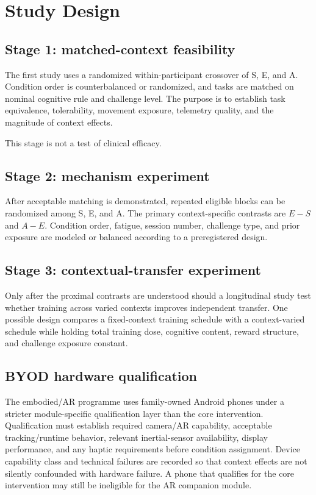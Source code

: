 \section{Study Design}

\subsection{Stage 1: matched-context feasibility}

The first study uses a randomized within-participant crossover of S, E, and A. Condition order is counterbalanced or randomized, and tasks are matched on nominal cognitive rule and challenge level. The purpose is to establish task equivalence, tolerability, movement exposure, telemetry quality, and the magnitude of context effects.

This stage is not a test of clinical efficacy.

\subsection{Stage 2: mechanism experiment}

After acceptable matching is demonstrated, repeated eligible blocks can be randomized among S, E, and A. The primary context-specific contrasts are \(E-S\) and \(A-E\). Condition order, fatigue, session number, challenge type, and prior exposure are modeled or balanced according to a preregistered design.

\subsection{Stage 3: contextual-transfer experiment}

Only after the proximal contrasts are understood should a longitudinal study test whether training across varied contexts improves independent transfer. One possible design compares a fixed-context training schedule with a context-varied schedule while holding total training dose, cognitive content, reward structure, and challenge exposure constant.

\subsection{BYOD hardware qualification}

The embodied/AR programme uses family-owned Android phones under a stricter module-specific qualification layer than the core intervention. Qualification must establish required camera/AR capability, acceptable tracking/runtime behavior, relevant inertial-sensor availability, display performance, and any haptic requirements before condition assignment. Device capability class and technical failures are recorded so that context effects are not silently confounded with hardware failure. A phone that qualifies for the core intervention may still be ineligible for the AR companion module.

